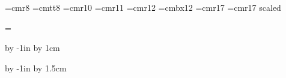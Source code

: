 










\vsize=297mm
\hsize=210mm



\nopagenumbers


\parindent=0pt

\def\epsfsize#1#2{#1}

\font\small=cmr8
\font\smalltt=cmtt8
\font\medium=cmr10
\font\largemed=cmr11
\font\large=cmr12
\font\largebx=cmbx12
\font\Large=cmr17
\font\huge=cmr17 scaled 


\headline={\hfil}

\advance\voffset by -1in
\advance\voffset by 1cm

\advance\hoffset by -1in
\advance\hoffset by 1.5cm

